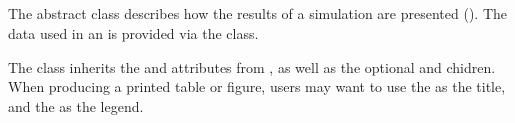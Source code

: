 \subsection{}
\label{class:output}

The abstract \Output class describes how the results of a simulation are presented ().  The data used in an \Output is provided via the \DataGenerator class.


\begin{blockChanged}
The \Output class inherits the  and  attributes from \SedBase, as well as the optional  and  chidren.  When producing a printed table or figure, users may want to use the  as the title, and the  as the legend.
\end{blockChanged}

